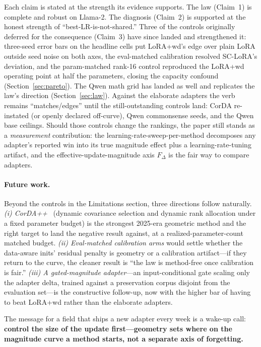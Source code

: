 \documentclass[11pt]{article}
\newcommand{\dw}{F_{\Delta}}
\begin{document}
Each claim is stated at the strength its evidence supports. The law (Claim~1) is
complete and robust on Llama-2. The diagnosis (Claim~2) is supported at the
honest strength of ``best-LR-is-not-shared.'' Three of the controls originally
deferred for the consequence (Claim~3) have since landed and strengthened it:
three-seed error bars on the headline cells put LoRA{+}wd's edge over plain LoRA
outside seed noise on both axes, the eval-matched calibration resolved
SC-LoRA's deviation, and the param-matched rank-16 control reproduced the
LoRA{+}wd operating point at half the parameters, closing the capacity
confound (Section~\ref{sec:pareto}). The Qwen math grid has landed as well and
replicates the law's direction (Section~\ref{sec:law}). Against the elaborate
adapters the verb remains
``matches/edges'' until the still-outstanding controls land: CorDA re-instated
(or openly declared off-curve), Qwen commonsense seeds, and the Qwen base
ceilings. Should those controls change the
rankings, the paper still stands as a \emph{measurement} contribution: the
learning-rate-sweep-per-method decomposes any adapter's reported win into its true
magnitude effect plus a learning-rate-tuning artifact, and the
effective-update-magnitude axis $\dw$ is the fair way to compare adapters.

\paragraph{Future work.} Beyond the controls in the Limitations section, three
directions follow naturally. \emph{(i) CorDA++}~\citep{yang2025cordapp} (dynamic
covariance selection and dynamic rank allocation under a fixed parameter budget)
is the strongest 2025-era geometric method and the right target to land the
negative result against, at a realized-parameter-count matched budget.
\emph{(ii) Eval-matched calibration arms} would settle whether the data-aware
inits' residual penalty is geometry or a calibration artifact---if they return to
the curve, the cleaner result is ``the law is method-free once calibration is
fair.'' \emph{(iii) A gated-magnitude adapter}---an input-conditional gate scaling
only the adapter delta, trained against a preservation corpus disjoint from the
evaluation set---is the constructive follow-up, now with the higher bar of having
to beat LoRA{+}wd rather than the elaborate adapters.

The message for a field that ships a new adapter every week is a wake-up call:
\textbf{control the size of the update first---geometry sets where on the magnitude
curve a method starts, not a separate axis of forgetting.}
\end{document}
